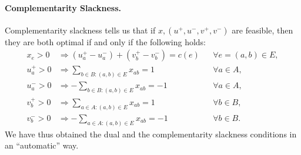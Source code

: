 \paragraph{Complementarity Slackness.} Complementarity slackness tells us that if
$x,(u^+,u^-,v^+,v^-)$ are feasible, then they are both optimal if and only if the following holds:
\begin{align*}
  x_e>0 &\Rightarrow (u_a^+-u_a^-)+(v_b^+-v_b^-)=c(e) && \forall e=(a,b)\in E,\\
  u_a^+>0 &\Rightarrow \sum_{b\in B:(a,b)\in E}x_{ab}=1 && \forall a\in A,\\
  u_a^->0 &\Rightarrow -\sum_{b\in B:(a,b)\in E}x_{ab}=-1 && \forall a\in A,\\
  v_b^+>0 &\Rightarrow \sum_{a\in A:(a,b)\in E}x_{ab}=1 && \forall b\in B,\\
  v_b^->0 &\Rightarrow -\sum_{a\in A:(a,b)\in E}x_{ab}=-1 && \forall b\in B.
\end{align*}
We have thus obtained the dual and the complementarity slackness conditions in an ``automatic''
way.

